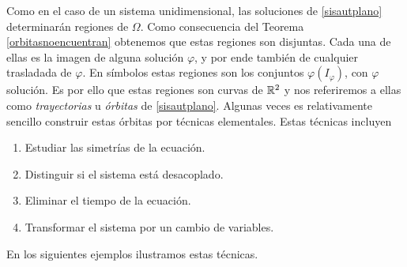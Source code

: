 Como en el caso de un sistema unidimensional, las soluciones de
\ref{sisautplano} determinarán regiones de $\Omega$. Como
consecuencia del Teorema \ref{orbitasnoencuentran} obtenemos que
estas regiones son disjuntas. Cada una de ellas es la imagen de
alguna solución $\varphi$, y por ende también de cualquier trasladada
de $\varphi$. En símbolos estas regiones son los conjuntos
$\varphi(I_{\varphi})$, con $\varphi$ solución. Es por ello que estas regiones
son curvas de $\rr^2$ y nos referiremos a ellas como
\emph{trayectorias} u \emph{órbitas} de
\eqref{sisautplano}. Algunas veces es relativamente  sencillo
construir estas órbitas por técnicas elementales. Estas técnicas
incluyen
\begin{enumerate}
    \item Estudiar las simetrías de la ecuación.
    \item Distinguir si el sistema está desacoplado.
    \item Eliminar el tiempo de la ecuación.
    \item Transformar el sistema por un cambio de variables.
\end{enumerate}
 En los siguientes ejemplos ilustramos estas técnicas.





